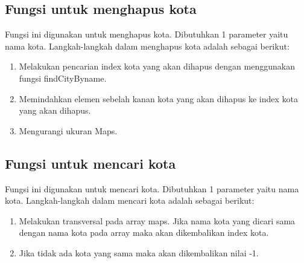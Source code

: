 \documentclass[]{article}
\begin{document}
\subsection{Fungsi untuk menghapus kota}

\par
Fungsi ini digunakan untuk menghapus kota. Dibutuhkan 1 parameter yaitu nama kota. Langkah-langkah dalam menghapus kota adalah sebagai berikut:
\begin{enumerate}
    \item Melakukan pencarian index kota yang akan dihapus dengan menggunakan fungsi findCityByname.
    \item Memindahkan elemen sebelah kanan kota yang akan dihapus ke index kota yang akan dihapus.
    \item Mengurangi ukuran Maps.
\end{enumerate}
\subsection{Fungsi untuk mencari kota}

\par
Fungsi ini digunakan untuk mencari kota. Dibutuhkan 1 parameter yaitu nama kota. Langkah-langkah dalam mencari kota adalah sebagai berikut:
\begin{enumerate}
    \item Melakukan transversal pada array maps. Jika nama kota yang dicari sama dengan nama kota pada array maka akan dikembalikan index kota.
    \item Jika tidak ada kota yang sama maka akan dikembalikan nilai -1.
\end{enumerate}
\end{document}
